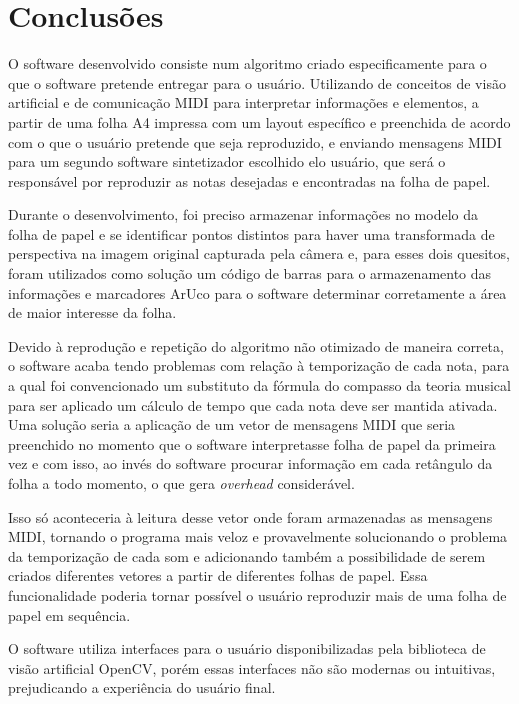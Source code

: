 \documentclass[12pt]{report}
\begin{document}
\chapter{Conclusões}
\label{cha:conclusoes}

O software desenvolvido consiste num algoritmo criado especificamente
para o que o software pretende entregar para o usuário. Utilizando de
conceitos de visão artificial e de comunicação MIDI para interpretar
informações e elementos, a partir de uma folha A4 impressa com um
layout específico e preenchida de acordo com o que o usuário pretende
que seja reproduzido, e enviando mensagens MIDI para um segundo
software sintetizador escolhido elo usuário, que será o responsável
por reproduzir as notas desejadas e encontradas na folha de papel.

Durante o desenvolvimento, foi preciso armazenar informações no modelo
da folha de papel e se identificar pontos distintos para haver uma
transformada de perspectiva na imagem original capturada pela câmera
e, para esses dois quesitos, foram utilizados como solução um código
de barras para o armazenamento das informações e marcadores ArUco para
o software determinar corretamente a área de maior interesse da folha.

Devido à reprodução e repetição do algoritmo não otimizado de maneira
correta, o software acaba tendo problemas com relação à temporização
de cada nota, para a qual foi convencionado um substituto da fórmula
do compasso da teoria musical para ser aplicado um cálculo de tempo
que cada nota deve ser mantida ativada. Uma solução seria a aplicação
de um vetor de mensagens MIDI que seria preenchido no momento que o
software interpretasse folha de papel da primeira vez e com isso, ao
invés do software procurar informação em cada retângulo da folha a
todo momento, o que gera {\it overhead} considerável.

Isso só aconteceria à leitura desse vetor onde foram armazenadas as
mensagens MIDI, tornando o programa mais veloz e provavelmente
solucionando o problema da temporização de cada som e adicionando
também a possibilidade de serem criados diferentes vetores a partir de
diferentes folhas de papel. Essa funcionalidade poderia tornar
possível o usuário reproduzir mais de uma folha de papel em sequência.

O software utiliza interfaces para o usuário disponibilizadas pela
biblioteca de visão artificial OpenCV, porém essas interfaces não são
modernas ou intuitivas, prejudicando a experiência do usuário
final.
\end{document}

